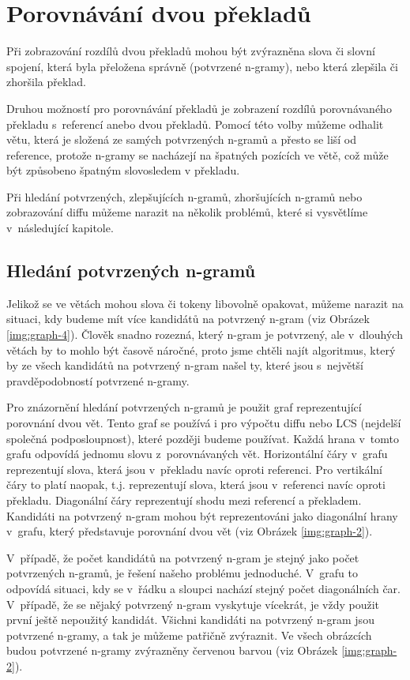 \chapter{Porovnávání dvou překladů}
\label{chap:compare}

Při zobrazování rozdílů dvou překladů mohou být zvýrazněna slova či slovní spojení,
  která byla přeložena správně (potvrzené \mbox{n-gramy)},
  nebo která zlepšila či zhoršila překlad.

Druhou možností pro porovnávání překladů je zobrazení rozdílů porovnávaného překladu s~referencí
  anebo dvou překladů.
Pomocí této volby můžeme odhalit větu,
  která je složená ze samých potvrzených n-gramů a přesto se liší od reference,
  protože \mbox{n-gramy} se nacházejí na špatných pozících ve větě,
  což může být způsobeno špatným slovosledem v překladu.

Při hledání potvrzených, zlepšujících \mbox{n-gramů}, zhoršujících \mbox{n-gramů} nebo zobrazování diffu můžeme narazit na několik problémů,
  které si vysvětlíme v~následující kapitole.

\section{Hledání potvrzených \mbox{n-gramů}}
Jelikož se ve větách mohou slova či tokeny libovolně opakovat,
  můžeme narazit na situaci,
  kdy budeme mít více kandidátů na potvrzený \mbox{n-gram} (viz Obrázek \ref{img:graph-4}).
Člověk snadno rozezná,
  který \mbox{n-gram} je potvrzený,
  ale v~dlouhých větách by to mohlo být časově náročné,
  proto jsme chtěli najít algoritmus,
  který by ze všech kandidátů na potvrzený \mbox{n-gram} našel ty,
  které jsou s~největší pravděpodobností potvrzené \mbox{n-gramy}.

Pro znázornění hledání potvrzených \mbox{n-gramů} je použit graf reprezentující porovnání dvou vět.
Tento graf se používá i pro výpočtu diffu nebo LCS (nejdelší společná podposloupnost),
  které později budeme používat.
Každá hrana v~tomto grafu odpovídá jednomu slovu z~porovnávaných vět.
Horizontální čáry v~grafu reprezentují slova, která jsou v~překladu navíc oproti referenci. 
Pro vertikální čáry to platí naopak, t.j. reprezentují slova, která jsou v~referenci navíc oproti překladu.
Diagonální čáry reprezentují shodu mezi referencí a překladem.
Kandidáti na potvrzený \mbox{n-gram} mohou být reprezentováni jako diagonální hrany v~grafu,
  který představuje porovnání dvou vět (viz Obrázek \ref{img:graph-2}).

V~případě,
  že počet kandidátů na potvrzený \mbox{n-gram} je stejný jako počet potvrzených \mbox{n-gramů},
  je řešení našeho problému jednoduché.
V~grafu to odpovídá situaci,
  kdy se v~řádku a sloupci nachází stejný počet diagonálních čar.
V~případě,
  že se nějaký potvrzený \mbox{n-gram} vyskytuje vícekrát,
  je vždy použit první ještě nepoužitý kandidát.
Všichni kandidáti na potvrzený \mbox{n-gram} jsou potvrzené \mbox{n-gramy},
  a tak je můžeme patřičně zvýraznit.
Ve všech obrázcích budou potvrzené \mbox{n-gramy} zvýrazněny červenou barvou (viz Obrázek \ref{img:graph-2}).

